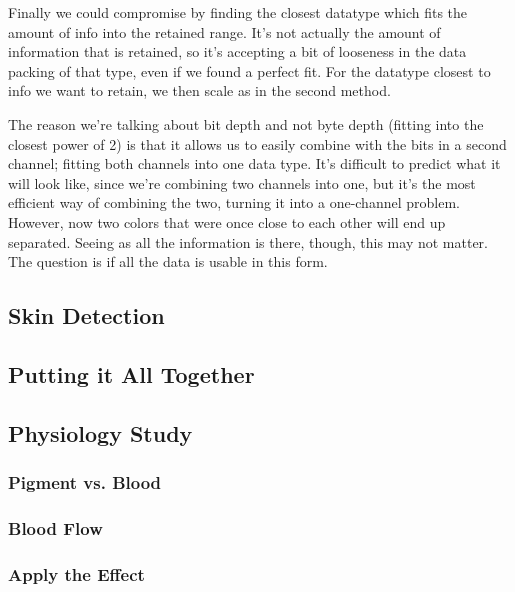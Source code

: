 \documentclass[10pt,a4paper]{article}
\begin{document}
Finally we could compromise by finding the closest datatype which fits the amount of info into the retained range. It's not actually the amount of information that is retained, so it's accepting a bit of looseness in the data packing of that type, even if we found a perfect fit. For the datatype closest to info we want to retain, we then scale as in the second method.

The reason we're talking about bit depth and not byte depth (fitting into the closest power of 2) is that it allows us to easily combine with the bits in a second channel; fitting both channels into one data type. It's difficult to predict what it will look like, since we're combining two channels into one, but it's the most efficient way of combining the two, turning it into a one-channel problem. However, now two colors that were once close to each other will end up separated. Seeing as all the information is there, though, this may not matter. The question is if all the data is usable in this form.



\subsection{Skin Detection}\label{sec:SkinDetection}

\subsection{Putting it All Together}\label{sec:PuttingItAllTogether}

\subsection{Physiology Study}\label{sec:PhysiologyStudy}

\subsubsection{Pigment vs. Blood}\label{sec:PigmentVs.Blood}

\subsubsection{Blood Flow}\label{sec:BloodFlow}

\subsubsection{Apply the Effect}\label{sec:ApplyTheEffect}
\end{document}
